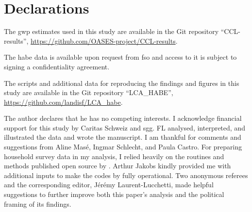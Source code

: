 \documentclass[referee, lineno, pdflatex,sn-apa]{sn-jnl}%
\theoremstyle{thmstyleone}%
\theoremstyle{thmstyletwo}%
\theoremstyle{thmstylethree}%
\begin{document}

\backmatter

\section*{Declarations}
The \ac{gwp} estimates used in this study are available in the Git repository ``CCL-results'', \url{https://github.com/OASES-project/CCL-results}.

The \ac{habe} data is available upon request from \ac{fso} and access to it is subject to signing a confidentiality agreement.

The scripts and additional data for reproducing the findings and figures in this study are available in the Git repository ``LCA\_HABE'', \url{https://github.com/landisf/LCA_habe}.

The author declares that he has no competing interests.
I acknowledge financial support for this study by Caritas Schweiz and \ac{sgg}.
FL analysed, interpreted, and illustrated the data and wrote the manuscript.
  I am thankful for comments and suggestions from Aline Masé, Ingmar Schlecht, and Paula Castro.
  For preparing household survey data in my analysis, I relied heavily on the routines and methods published open source by \citet{jakobs_nfp73_2023}.
  Arthur Jakobs kindly provided me with additional inputs to make the codes by \citet{jakobs_nfp73_2023} fully operational.
  Two anonymous referees and the corresponding editor, Jérémy Laurent-Lucchetti, made helpful suggestions to further improve both this paper's analysis and the political framing of its findings.
\end{document}
